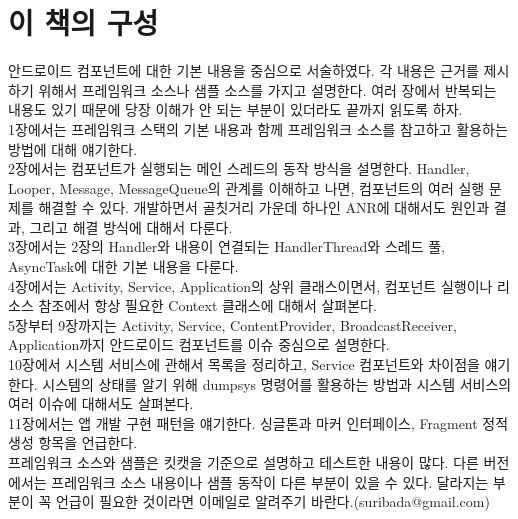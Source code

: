 \documentclass[a4paper,hidelinks,10pt,openany]{book} %
\begin{document}
\chapter*{이 책의 구성}
안드로이드 컴포넌트에 대한 기본 내용을 중심으로 서술하였다. 각 내용은 근거를 제시하기 위해서 프레임워크 소스나 샘플 소스를 가지고 설명한다.
여러 장에서 반복되는 내용도 있기 때문에 당장 이해가 안 되는 부분이 있더라도 끝까지 읽도록 하자.\\

1장에서는 프레임워크 스택의 기본 내용과 함께 프레임워크 소스를 참고하고 활용하는 방법에 대해 얘기한다.\\

2장에서는 컴포넌트가 실행되는 메인 스레드의 동작 방식을 설명한다.
Handler, Looper, Message, MessageQueue의 관계를 이해하고 나면, 컴포넌트의 여러 실행 문제를 해결할 수 있다. 
개발하면서 골칫거리 가운데 하나인 ANR에 대해서도 원인과 결과, 그리고 해결 방식에 대해서 다룬다.\\

3장에서는 2장의 Handler와 내용이 연결되는 HandlerThread와 스레드 풀, AsyncTask에 대한 기본 내용을 다룬다.\\

4장에서는 Activity, Service, Application의 상위 클래스이면서, 컴포넌트 실행이나 리소스 참조에서 항상 필요한 Context 클래스에 대해서 살펴본다.\\

5장부터 9장까지는 Activity, Service, ContentProvider, BroadcastReceiver, Application까지 안드로이드 컴포넌트를 이슈 중심으로 설명한다.\\

10장에서 시스템 서비스에 관해서 목록을 정리하고, Service 컴포넌트와 차이점을 얘기한다. 시스템의 상태를 알기 위해 dumpsys 명령어를 활용하는 방법과 시스템 서비스의 여러 이슈에 대해서도 살펴본다.\\

11장에서는 앱 개발 구현 패턴을 얘기한다. 싱글톤과 마커 인터페이스, Fragment 정적 생성 항목을 언급한다.\\

프레임워크 소스와 샘플은 킷캣을 기준으로 설명하고 테스트한 내용이 많다. 다른 버전에서는 프레임워크 소스 내용이나 샘플 동작이 다른 부분이 있을 수 있다. 달라지는 부분이 꼭 언급이 필요한 것이라면 이메일로 알려주기 바란다.(suribada@gmail.com)






\end{document}
